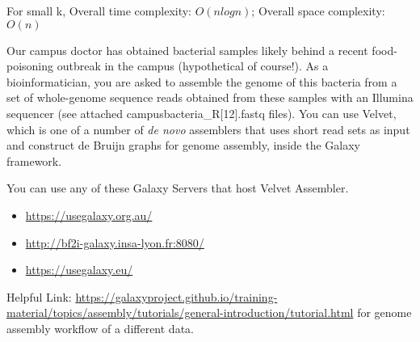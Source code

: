 \documentclass[solution,addpoints,12pt]{exam}
\begin{document}
{\begin{questions}
\begin{parts}
\begin{solution}
\vspace{2mm}
For small k,
Overall time complexity: $O(nlogn)$; 
Overall space complexity: $O(n)$
 \end{solution}
\end{parts}


 Our campus doctor has obtained bacterial samples likely behind a recent food-poisoning outbreak in the campus (hypothetical of course!). As a bioinformatician, you are asked to assemble the genome of this bacteria from a set of whole-genome sequence reads obtained from these samples with an Illumina sequencer (see attached campusbacteria\_R[12].fastq files). You can use Velvet, which is one of a number of {\it de novo} assemblers that uses short read sets as input and construct de Bruijn graphs for genome assembly, inside the Galaxy framework.

You can use any of these Galaxy Servers that host Velvet Assembler.
{\small 
\begin{itemize}[noitemsep,nolistsep]
    \item \url{https://usegalaxy.org.au/}
    \item \url{http://bf2i-galaxy.insa-lyon.fr:8080/}
    \item \url{https://usegalaxy.eu/}
\end{itemize}}
Helpful Link: \url{https://galaxyproject.github.io/training-material/topics/assembly/tutorials/general-introduction/tutorial.html} for genome assembly workflow of a different data. 

\end{questions}}
\end{document}
